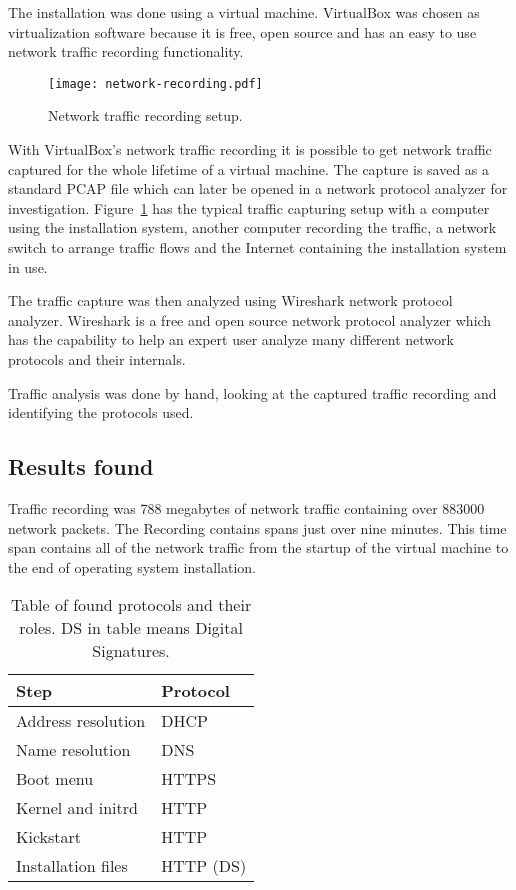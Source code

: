 The installation was done using a virtual machine. VirtualBox was
chosen as virtualization software because it is free, open source and
has an easy to use network traffic recording functionality.

\begin{figure}[h]
  \caption{Network traffic recording setup.\label{fig:network-recording}}
  \texttt{[image: network-recording.pdf]}
\end{figure}

With VirtualBox's network traffic recording it is possible to get
network traffic captured for the whole lifetime of a virtual
machine. The capture is saved as a standard PCAP file which can later
be opened in a network protocol analyzer for
investigation. Figure~\ref{fig:network-recording} has the typical
traffic capturing setup with a computer using the installation system,
another computer recording the traffic, a network switch to arrange
traffic flows and the Internet containing the installation system in
use.

The traffic capture was then analyzed using Wireshark network protocol
analyzer. Wireshark is a free and open source network protocol
analyzer which has the capability to help an expert user analyze many
different network protocols and their internals.

Traffic analysis was done by hand, looking at the captured traffic
recording and identifying the protocols used.

\subsection{Results found}

Traffic recording was 788 megabytes of network traffic containing over
883000 network packets. The Recording contains spans just over nine
minutes. This time span contains all of the network traffic from the
startup of the virtual machine to the end of operating system
installation.

\begin{table}[!ht]
  \def\arraystretch{1.1}%
  \begin{center}
    \caption{Table of found protocols and their roles. DS in table
      means Digital Signatures.\label{tab:found_protocols_table}}
    \begin{tabular}{| l | l |}
      \hline
      Step               & Protocol    \\
      \hline
      Address resolution & DHCP        \\
      Name resolution    & DNS         \\
      Boot menu          & HTTPS       \\
      Kernel and initrd  & HTTP        \\
      Kickstart          & HTTP        \\
      Installation files & HTTP (DS)   \\
      \hline
    \end{tabular}
  \end{center}
\end{table}

